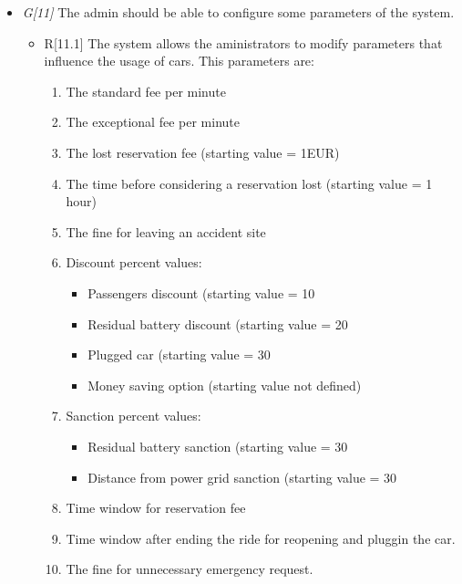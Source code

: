 \begin{itemize}
				\item \textit{G[11]} The admin should be able to configure some parameters of the system.
					\begin{itemize}
						\item R[11.1] The system allows the aministrators to modify parameters that influence the usage of cars. This parameters are:
							\begin{enumerate}
								\item The standard fee per minute
								\item The exceptional fee per minute
								\item The lost reservation fee (starting value = 1EUR)
								\item The time before considering a reservation lost (starting value = 1 hour)
								\item The fine for leaving an accident site %
								\item Discount percent values:
									\begin{itemize}
										\item Passengers discount (starting value = 10%
										\item Residual battery discount (starting value = 20%
										\item Plugged car (starting value = 30%
										\item Money saving option (starting value not defined)
									\end{itemize}
								\item Sanction percent values:
									\begin{itemize}
										\item Residual battery sanction (starting value = 30%
										\item Distance from power grid sanction (starting value = 30%
									\end{itemize}
								\item Time window for reservation fee
								\item Time window after ending the ride for reopening and pluggin the car.
								\item The fine for unnecessary emergency request.
							\end{enumerate}
					\end{itemize}
\end{itemize}





